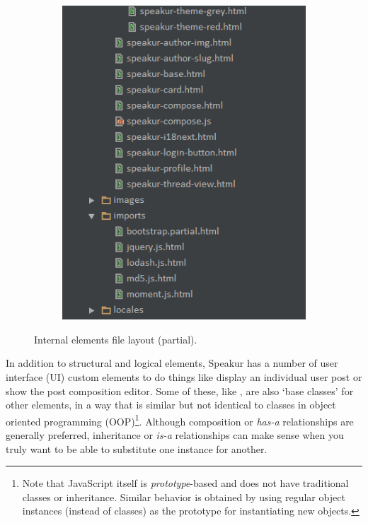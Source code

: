 \begin{figure}[htb]
\begin{subfigure}[b]{0.48\textwidth}
		\includegraphics[width=\textwidth]{images/file_layout_b.png}
	\end{subfigure} %
	\caption{Internal elements file layout (partial).}
	\label{f:file_layout}
\end{figure}

In addition to structural and logical elements, Speakur has a number of user interface (UI) custom elements to do things like display an individual user post or show the post composition editor.
Some of these, like , are also `base classes' for other elements,
in a way that is similar but not identical to classes in object oriented programming (OOP)\footnote{Note that JavaScript itself is \textit{prototype}-based and does not have traditional classes or inheritance. 
Similar behavior is obtained by using regular object instances (instead of classes) as the prototype for instantiating new objects.}. 
Although composition or \textit{has-a} relationships are generally preferred, inheritance or \textit{is-a} relationships can make sense when you truly want to be able to substitute one instance for another.

